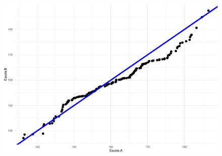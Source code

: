 \documentclass[
  10pt,
  ignorenonframetext,
]{beamer}
\begin{document}
\begin{frame}
\begin{figure}

{\centering \includegraphics[width=1\textwidth,height=\textheight]{exploracao-visualizacao_files/figure-beamer/unnamed-chunk-120-1.pdf}

}

\end{figure}
\end{frame}
\end{document}
